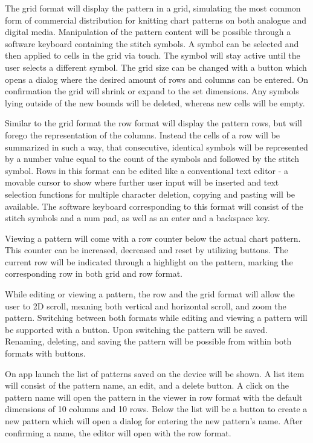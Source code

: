 \documentclass[a4paper,11pt]{kth-mag}
\begin{document}
The grid format will display the pattern in a grid, simulating the most common form of commercial distribution for knitting chart patterns on both analogue and digital media. Manipulation of the pattern content will be possible through a software keyboard containing the stitch symbols. A symbol can be selected and then applied to cells in the grid via touch. The symbol will stay active until the user selects a different symbol. The grid size can be changed with a button which opens a dialog where the desired amount of rows and columns can be entered. On confirmation the grid will shrink or expand to the set dimensions. Any symbols lying outside of the new bounds will be deleted, whereas new cells will be empty.

Similar to the grid format the row format will display the pattern rows, but will forego the representation of the columns. Instead the cells of a row will be summarized in such a way, that consecutive, identical symbols will be represented  by a number value equal to the count of the symbols and followed by the stitch symbol. Rows in this format can be edited like a conventional text editor - a movable cursor to show where further user input will be inserted and text selection functions for multiple character deletion, copying and pasting will be available. The software keyboard corresponding to this format will consist of the stitch symbols and a num pad, as well as an enter and a backspace key.

Viewing a pattern will come with a row counter below the actual chart pattern. This counter can be increased, decreased and reset by utilizing buttons. The current row will be indicated through a highlight on the pattern, marking the corresponding row in both grid and row format.

While editing or viewing a pattern, the row and the grid format will allow the user to 2D scroll, meaning both vertical and horizontal scroll, and zoom the pattern. Switching between both formats while editing and viewing a pattern will be supported with a button. Upon switching the pattern will be saved. Renaming, deleting, and saving the pattern will be possible from within both formats with buttons.

On app launch the list of patterns saved on the device will be shown. A list item will consist of the pattern name, an edit, and a delete button. A click on the pattern name will open the pattern in the viewer in row format with the default dimensions of 10 columns and 10 rows. Below the list will be a button to create a new pattern which will open a dialog for entering the new pattern’s name. After confirming a name, the editor will open with the row format.
\end{document}
